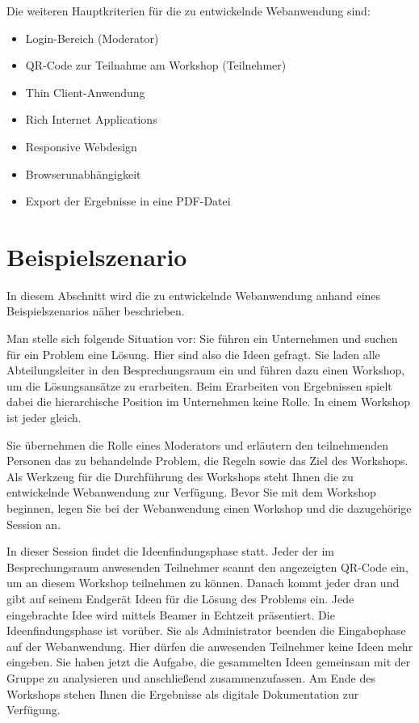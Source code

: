 Die weiteren Hauptkriterien für die zu entwickelnde Webanwendung sind:
\begin{itemize}
\item Login-Bereich (Moderator)
\item QR-Code zur Teilnahme am Workshop (Teilnehmer)
\item Thin Client-Anwendung
\item Rich Internet Applications
\item Responsive Webdesign 
\item Browserunabhängigkeit
\item Export der Ergebnisse in eine PDF-Datei
\end{itemize}

\section{Beispielszenario}
\label{beispielszenario}
In diesem Abschnitt wird die zu entwickelnde Webanwendung anhand eines Beispielszenarios näher beschrieben.\bigskip

Man stelle sich folgende Situation vor: Sie führen ein Unternehmen und suchen für ein Problem eine Lösung. Hier sind also die Ideen gefragt. Sie laden alle Abteilungsleiter in den Besprechungsraum ein und führen dazu einen Workshop, um die Lösungsansätze zu erarbeiten. Beim Erarbeiten von Ergebnissen spielt dabei die hierarchische Position im Unternehmen keine Rolle. In einem Workshop ist jeder \glqq gleich\grqq{}.\bigskip

Sie übernehmen die Rolle eines Moderators und erläutern den teilnehmenden Personen das zu behandelnde Problem, die Regeln sowie das Ziel des Workshops. Als Werkzeug für die Durchführung des Workshops steht Ihnen die zu entwickelnde Webanwendung zur Verfügung. Bevor Sie mit dem Workshop beginnen, legen Sie bei der Webanwendung einen Workshop und die dazugehörige Session an.\bigskip

In dieser Session findet die Ideenfindungsphase statt. Jeder der im Besprechungsraum anwesenden Teilnehmer scannt den angezeigten QR-Code ein, um an diesem Workshop teilnehmen zu können. Danach kommt jeder dran und gibt auf seinem Endgerät Ideen für die Lösung des Problems ein. Jede eingebrachte Idee wird mittels Beamer in Echtzeit präsentiert.  Die Ideenfindungsphase ist vorüber. Sie als Administrator beenden die Eingabephase auf der Webanwendung. Hier dürfen die anwesenden Teilnehmer keine Ideen mehr eingeben. Sie haben jetzt die Aufgabe, die gesammelten Ideen gemeinsam mit der Gruppe zu analysieren und anschließend zusammenzufassen. Am Ende des Workshops stehen Ihnen die Ergebnisse als digitale Dokumentation zur Verfügung.

